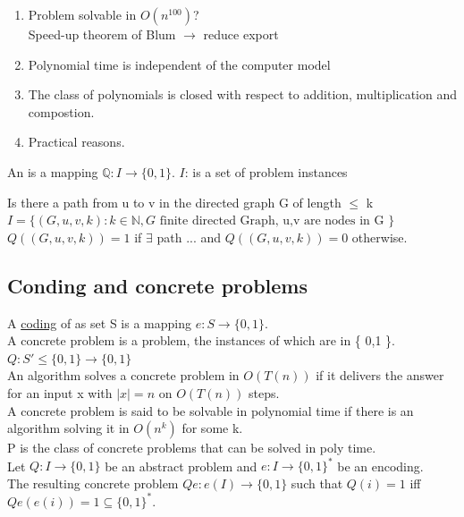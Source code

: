 \begin{enumerate}[label={\arabic*.}]
 \item Problem solvable in $O(n^100)$? \\
       Speed-up theorem of Blum $\rightarrow$ reduce export
 \item Polynomial time is independent of the computer model
 \item The class of polynomials is closed with respect to addition, multiplication and compostion.
 \item Practical reasons.
\end{enumerate}
 
\begin{definition}
  An  is a mapping $\mathbb{Q}:I \rightarrow \{0,1\}$.
  $I$: is a set of problem instances
\end{definition}

\begin{example}
  Is there a path from u to v in the directed graph G of length $\leq$ k $I=\{ (G,u,v,k): k \in \mathbb{N}, G \text{ finite directed Graph, u,v are nodes in G }  \}$ \\
  $Q( (G,u,v,k) ) = 1$ if $\exists$ path ... and $Q( (G,u,v,k) ) = 0$ otherwise.
\end{example}

\subsection{Conding and concrete problems}

A \underline{coding} of as set S is a mapping $e: S \rightarrow \{0,1\}$. \\
A concrete problem is a problem, the instances of which are in \{ 0,1 \}. \\
$Q: S' \leq \{ 0,1 \} \rightarrow \{ 0,1 \}$ \\
An algorithm solves a concrete problem in $O(T(n))$ if it delivers the answer for an input x with $\left| x \right| = n$ on $O(T(n))$ steps. \\
A concrete problem is said to be solvable in polynomial time if there is an algorithm solving it in $O(n^k)$ for some k.\\
P is the class of concrete problems that can be solved in poly time. \\
Let $Q:I \rightarrow \{ 0,1 \}$ be an abstract problem and $e:I \rightarrow \{ 0,1 \}^*$ be an encoding.\\
The resulting concrete problem $Qe: e(I) \rightarrow \{ 0,1 \}$ such that $Q(i) = 1$ iff $Qe(e(i)) = 1 \subseteq
 \{ 0,1 \}^*$.
 
